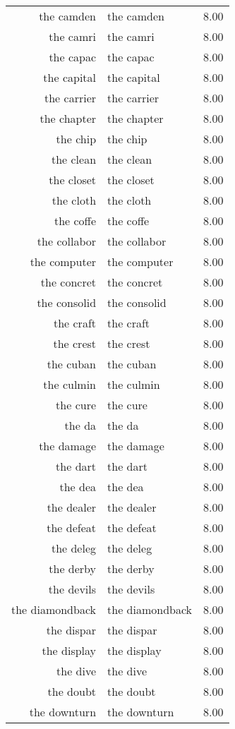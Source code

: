 \begin{table}[ht]
\begin{tabular}{rlr}
  the camden & the camden & 8.00 \\ 
  the camri & the camri & 8.00 \\ 
  the capac & the capac & 8.00 \\ 
  the capital & the capital & 8.00 \\ 
  the carrier & the carrier & 8.00 \\ 
  the chapter & the chapter & 8.00 \\ 
  the chip & the chip & 8.00 \\ 
  the clean & the clean & 8.00 \\ 
  the closet & the closet & 8.00 \\ 
  the cloth & the cloth & 8.00 \\ 
  the coffe & the coffe & 8.00 \\ 
  the collabor & the collabor & 8.00 \\ 
  the computer & the computer & 8.00 \\ 
  the concret & the concret & 8.00 \\ 
  the consolid & the consolid & 8.00 \\ 
  the craft & the craft & 8.00 \\ 
  the crest & the crest & 8.00 \\ 
  the cuban & the cuban & 8.00 \\ 
  the culmin & the culmin & 8.00 \\ 
  the cure & the cure & 8.00 \\ 
  the da & the da & 8.00 \\ 
  the damage & the damage & 8.00 \\ 
  the dart & the dart & 8.00 \\ 
  the dea & the dea & 8.00 \\ 
  the dealer & the dealer & 8.00 \\ 
  the defeat & the defeat & 8.00 \\ 
  the deleg & the deleg & 8.00 \\ 
  the derby & the derby & 8.00 \\ 
  the devils & the devils & 8.00 \\ 
  the diamondback & the diamondback & 8.00 \\ 
  the dispar & the dispar & 8.00 \\ 
  the display & the display & 8.00 \\ 
  the dive & the dive & 8.00 \\ 
  the doubt & the doubt & 8.00 \\ 
  the downturn & the downturn & 8.00 \\ 

\end{tabular}
\end{table}
